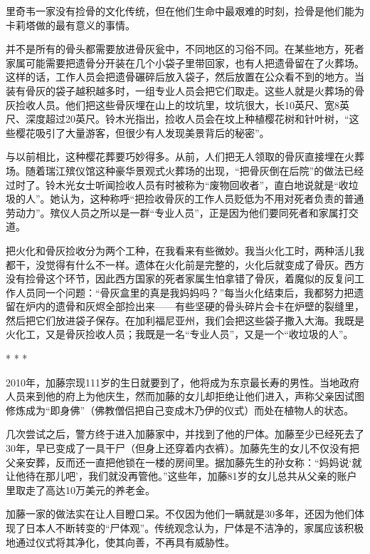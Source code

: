 \documentclass[12pt,oneside]{book}
\begin{document}
\begin{bookref}[frametitle={\cite{好好告别}}]
里奇韦一家没有捡骨的文化传统，但在他们生命中最艰难的时刻，捡骨是他们能为卡莉塔做的最有意义的事情。

并不是所有的骨头都需要放进骨灰瓮中，不同地区的习俗不同。在某些地方，死者家属可能需要把遗骨分开装在几个小袋子里带回家，也有人把遗骨留在了火葬场。这样的话，工作人员会把遗骨碾碎后放入袋子，然后放置在公众看不到的地方。当装有骨灰的袋子越积越多时，一组专业人员会把它们取走。这些人就是火葬场的骨灰捡收人员。他们把这些骨灰埋在山上的坟坑里，坟坑很大，长10英尺、宽8英尺、深度超过20英尺。铃木光指出，捡收人员会在坟上种植樱花树和针叶树，“这些樱花吸引了大量游客，但很少有人发现美景背后的秘密”。

与以前相比，这种樱花葬要巧妙得多。从前，人们把无人领取的骨灰直接埋在火葬场。随着瑞江殡仪馆这种豪华景观式火葬场的出现，“把骨灰倒在后院”的做法已经过时了。铃木光女士听闻捡收人员有时被称为“废物回收者”，直白地说就是“收垃圾的人”。她认为，这种称呼“把捡收骨灰的工作人员贬低为不用对死者负责的普通劳动力”。殡仪人员之所以是一群“专业人员”，正是因为他们要同死者和家属打交道。

把火化和骨灰捡收分为两个工种，在我看来有些微妙。我当火化工时，两种活儿我都干，没觉得有什么不一样。遗体在火化前是完整的，火化后就变成了骨灰。西方没有捡骨这个环节，因此西方国家的死者家属生怕拿错了骨灰，着魔似的反复问工作人员同一个问题：“骨灰盒里的真是我妈妈吗？”每当火化结束后，我都努力把遗留在炉内的遗骨和灰烬全部捡出来——有些坚硬的骨头碎片会卡在炉壁的裂缝里，然后把它们放进袋子保存。在加利福尼亚州，我们会把这些袋子撒入大海。我既是火化工，又是骨灰捡收人员；我既是一名“专业人员”，又是一个“收垃圾的人”。

\begin{center}
* * *
\end{center}

2010年，加藤宗现111岁的生日就要到了，他将成为东京最长寿的男性。当地政府人员来到他的府上为他庆生，然而加藤的女儿却拒绝让他们进入，声称父亲因试图修炼成为“即身佛”（佛教僧侣把自己变成木乃伊的仪式）而处在植物人的状态。

几次尝试之后，警方终于进入加藤家中，并找到了他的尸体。加藤至少已经死去了30年，早已变成了一具干尸（但身上还穿着内衣裤）。加藤先生的女儿不仅没有把父亲安葬，反而还一直把他锁在一楼的房间里。据加藤先生的孙女称：“妈妈说‘就让他待在那儿吧’，我们就没再管他。”这些年，加藤81岁的女儿总共从父亲的账户里取走了高达10万美元的养老金。

加藤一家的做法实在让人目瞪口呆。不仅因为他们一瞒就是30多年，还因为他们体现了日本人不断转变的“尸体观”。传统观念认为，尸体是不洁净的，家属应该积极地通过仪式将其净化，使其向善，不再具有威胁性。


\end{bookref}
\end{document}
